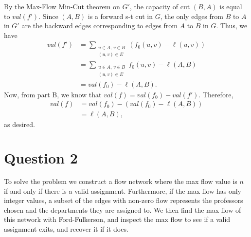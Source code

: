 \documentclass[11pt]{exam}
\begin{document}
By the Max-Flow Min-Cut theorem on $G'$, the capacity of cut $(B, A)$
is equal to $\mathit{val}(f')$. Since $(A,B)$ is a forward s-t cut in
$G$, the only edges from $B$ to $A$ in $G'$ are the backward edges
corresponding to edges from $A$ to $B$ in $G$. Thus, we have
\[
  \begin{aligned} \mathit{val}(f') &= \sum_{\substack{u \in A,\, v
    \in B \\ (u,v) \in E}} (f_0(u,v)-\ell(u,v))\\ &=
    \sum_{\substack{u \in A,\, v \in B \\ (u,v) \in E}} f_0(u,v) -
    \ell(A,B)\\ &= \mathit{val}(f_0)-\ell(A,B).
  \end{aligned}
\]
Now, from part B, we know that $\mathit{val}(f) = \mathit{val}(f_0) -
\mathit{val}(f')$. Therefore,
\[
  \begin{aligned}
    \mathit{val}(f)
    &= \mathit{val}(f_0) -
    (\mathit{val}(f_0)-\ell(A,B))\\
    &= \ell(A,B),
  \end{aligned}
\]
as desired.

\section{Question 2}

To solve the problem we construct a flow network where the max flow
value is $ n $ if and only if there is a valid assignment.
Furthermore, if the max flow has only integer values, a subset of the
edges with non-zero flow represents the professors chosen and the
departments they are assigned to. We then find the max flow of this
network with Ford-Fulkerson, and inspect the max flow to see if a
valid assignment exits, and recover it if it does.
\end{document}
